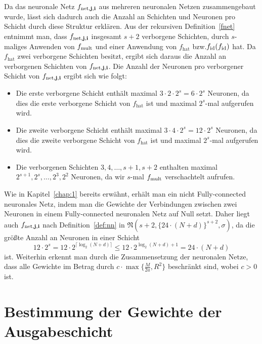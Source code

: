 Da das neuronale Netz $f_{\mathrm{net},\mathbf{j},\mathbf{i}}$ aus mehreren neuronalen Netzen zusammengebaut wurde, lässt sich dadurch auch die Anzahl an Schichten und Neuronen pro Schicht durch diese Struktur erklären. Aus der rekursiven Definition~\ref{fnet} entnimmt man, dass $f_{\mathrm{net},\mathbf{j},\mathbf{i}}$ insgesamt $s + 2$ verborgene Schichten, durch $s$-maliges Anwenden von $f_{\mathrm{mult}}$ und einer Anwendung von $f_{\mathrm{hat}}$ bzw.\@ $f_{\mathrm{id}}(f_{\mathrm{id}})$ hat. Da $f_{\mathrm{hat}}$ zwei verborgene Schichten besitzt, ergibt sich daraus die Anzahl an verborgenen Schichten von $f_{\mathrm{net},\mathbf{j},\mathbf{i}}$.
Die Anzahl der Neuronen pro verborgener Schicht von $f_{\mathrm{net},\mathbf{j},\mathbf{i}}$ ergibt sich wie folgt:
\begin{itemize}
\item Die erste verborgene Schicht enthält maximal $3 \cdot 2 \cdot 2^s = 6 \cdot 2^s$ Neuronen, da dies die erste verborgene Schicht von $f_{\mathrm{hat}}$ ist und maximal $2^s$-mal aufgerufen wird. 
\item Die zweite verborgene Schicht enthält maximal $3 \cdot 4 \cdot 2^s = 12\cdot 2^s$ Neuronen, da dies die zweite verborgene Schicht von $f_{\mathrm{hat}}$ ist und maximal $2^s$-mal aufgerufen wird.
\item Die verborgenen Schichten $3, 4,\dots, s + 1,s + 2$ enthalten maximal   $2^{s+ 1}, 2^s, \dots, 2^3, 2^2$ Neuronen, da wir $s$-mal $f_{\mathrm{mult}}$ verschachtelt aufrufen. 
\end{itemize}  
Wie in Kapitel~\ref{chap:1} bereits erwähnt, erhält man ein nicht Fully-connected neuronales Netz, indem man die Gewichte der Verbindungen zwischen zwei Neuronen in einem Fully-connected neuronalen Netz auf Null setzt. Daher liegt auch $f_{\mathrm{net},\mathbf{j},\mathbf{i}}$ nach Definition~\ref{def:nn} in $\mathfrak{N}(s + 2,\{24 \cdot (N + d)\}^{s + 2},\sigma)$, da die größte Anzahl an Neuronen in einer Schicht $$12 \cdot 2^s = 12 \cdot 2^{\lceil\log_2(N + d)\rceil} \leq 12 \cdot 2^{\log_2(N + d) + 1} = 24 \cdot (N + d)$$ ist. Weiterhin erkennt man durch die Zusammensetzung der neuronalen Netze, dass alle Gewichte im Betrag durch $c \cdot \max\{\frac{M}{2a}, R^2\}$ beschränkt sind, wobei $c > 0$ ist. 

\section{Bestimmung der Gewichte der Ausgabeschicht}
\label{subsec:2.2}


